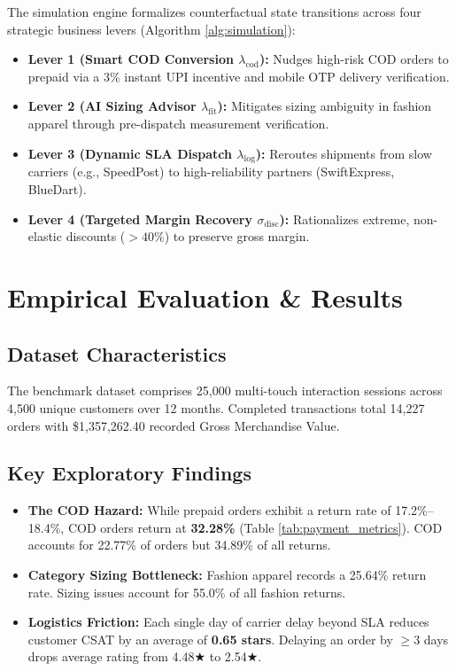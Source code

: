 \documentclass[conference]{IEEEtran}
\begin{document}
The simulation engine formalizes counterfactual state transitions across four strategic business levers (Algorithm \ref{alg:simulation}):
\begin{itemize}
    \item \textbf{Lever 1 (Smart COD Conversion $\lambda_{\text{cod}}$):} Nudges high-risk COD orders to prepaid via a 3\% instant UPI incentive and mobile OTP delivery verification.
    \item \textbf{Lever 2 (AI Sizing Advisor $\lambda_{\text{fit}}$):} Mitigates sizing ambiguity in fashion apparel through pre-dispatch measurement verification.
    \item \textbf{Lever 3 (Dynamic SLA Dispatch $\lambda_{\text{log}}$):} Reroutes shipments from slow carriers (e.g., SpeedPost) to high-reliability partners (SwiftExpress, BlueDart).
    \item \textbf{Lever 4 (Targeted Margin Recovery $\sigma_{\text{disc}}$):} Rationalizes extreme, non-elastic discounts ($>40\%$) to preserve gross margin.
\end{itemize}

\section{Empirical Evaluation \& Results}

\subsection{Dataset Characteristics}
The benchmark dataset comprises 25,000 multi-touch interaction sessions across 4,500 unique customers over 12 months. Completed transactions total 14,227 orders with \$1,357,262.40 recorded Gross Merchandise Value.

\subsection{Key Exploratory Findings}
\begin{itemize}
    \item \textbf{The COD Hazard:} While prepaid orders exhibit a return rate of 17.2\%--18.4\%, COD orders return at \textbf{32.28\%} (Table \ref{tab:payment_metrics}). COD accounts for 22.77\% of orders but 34.89\% of all returns.
    \item \textbf{Category Sizing Bottleneck:} Fashion apparel records a 25.64\% return rate. Sizing issues account for 55.0\% of all fashion returns.
    \item \textbf{Logistics Friction:} Each single day of carrier delay beyond SLA reduces customer CSAT by an average of \textbf{0.65 stars}. Delaying an order by $\ge 3$ days drops average rating from 4.48★ to 2.54★.
\end{itemize}
\end{document}
